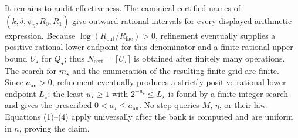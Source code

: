 It remains to audit effectiveness.  The canonical certified names of \((k,\delta,\psi_{\eta},R_0,R_1)\) give outward rational intervals for every displayed arithmetic expression.  Because \(\log(R_{\mathrm{out}}/R_{\mathrm{fac}})>0\), refinement eventually supplies a positive rational lower endpoint for this denominator and a finite rational upper bound \(U_{\star}\) for \(Q_{\star}\); thus \(N_{\mathrm{cert}}=\lceil U_{\star}\rceil\) is obtained after finitely many operations.  The search for \(m_{\star}\) and the enumeration of the resulting finite grid are finite.  Since \(a_{\mathrm{an}}>0\), refinement eventually produces a strictly positive rational lower endpoint \(L_{\star}\); the least \(u_{\star}\ge1\) with \(2^{-u_{\star}}\le L_{\star}\) is found by a finite integer search and gives the prescribed \(0<a_{\star}\le a_{\mathrm{an}}\).  No step queries \(M\), \(\eta\), or their law.  Equations (1)--(4) apply universally after the bank is computed and are uniform in \(n\), proving the claim.